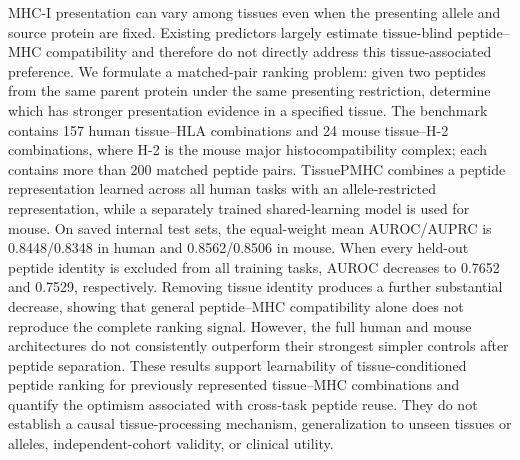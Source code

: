 MHC-I presentation can vary among tissues even when the presenting allele and source protein are fixed. Existing predictors largely estimate tissue-blind peptide--MHC compatibility and therefore do not directly address this tissue-associated preference. We formulate a matched-pair ranking problem: given two peptides from the same parent protein under the same presenting restriction, determine which has stronger presentation evidence in a specified tissue. The benchmark contains 157 human tissue--HLA combinations and 24 mouse tissue--H-2 combinations, where H-2 is the mouse major histocompatibility complex; each contains more than 200 matched peptide pairs. TissuePMHC combines a peptide representation learned across all human tasks with an allele-restricted representation, while a separately trained shared-learning model is used for mouse. On saved internal test sets, the equal-weight mean AUROC/AUPRC is 0.8448/0.8348 in human and 0.8562/0.8506 in mouse. When every held-out peptide identity is excluded from all training tasks, AUROC decreases to 0.7652 and 0.7529, respectively. Removing tissue identity produces a further substantial decrease, showing that general peptide--MHC compatibility alone does not reproduce the complete ranking signal. However, the full human and mouse architectures do not consistently outperform their strongest simpler controls after peptide separation. These results support learnability of tissue-conditioned peptide ranking for previously represented tissue--MHC combinations and quantify the optimism associated with cross-task peptide reuse. They do not establish a causal tissue-processing mechanism, generalization to unseen tissues or alleles, independent-cohort validity, or clinical utility.
